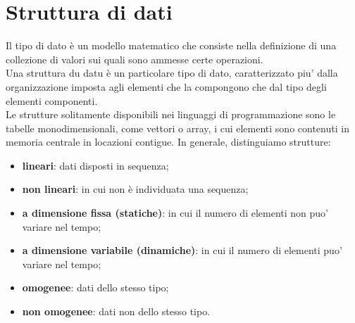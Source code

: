 \documentclass[12pt]{report}
\begin{document}
	\section{Struttura di dati}
	Il tipo di dato è un modello matematico che consiste nella definizione di una collezione di valori sui quali sono ammesse certe operazioni. \\
	Una struttura du datu è un particolare tipo di dato, caratterizzato piu' dalla organizzazione imposta agli elementi che la compongono che dal tipo degli elementi componenti. \\
	Le strutture solitamente disponibili nei linguaggi di programmazione sono le tabelle monodimensionali, come vettori o array, i cui elementi sono contenuti in memoria centrale in locazioni contigue. In generale, distinguiamo strutture:
	\begin{itemize}
		\item \textbf{lineari}: dati disposti in sequenza;
		\item \textbf{non lineari}: in cui non è individuata una sequenza;
		\item \textbf{a dimensione fissa (statiche)}: in cui il numero di elementi non puo' variare nel tempo;
		\item \textbf{a dimensione variabile (dinamiche)}: in cui il numero di elementi puo' variare nel tempo;
		\item \textbf{omogenee}: dati dello stesso tipo;
		\item \textbf{non omogenee}: dati non dello stesso tipo.
	\end{itemize}
\end{document}
